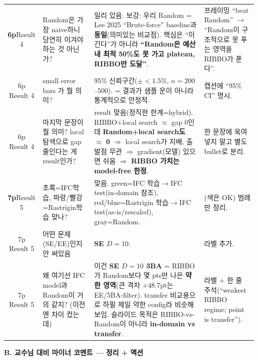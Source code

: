 \documentclass[10pt]{article}
\begin{document}
\begin{longtable}{S Q A F}
\textbf{6p}\newline Result 4 & Random은 가장 naive하니 당연히 이겨야 하는 것 아닌가? & 일리 있음. 보강: 우리 Random = Lee 2025 ``Brute-force'' baseline과 \textbf{동일}(의미있는 비교점). 핵심은 ``이긴다''가 아니라 \textbf{``Random은 예산 내 최적 50\%도 못 가고 plateau, RIBBO만 도달''}. & 프레이밍 ``beat Random'' $\to$ ``Random이 구조적으로 못 푸는 영역을 RIBBO가 푼다''. \\
6p Result 4 & small error bars 가 뭘 의미? & 95\% 신뢰구간($\pm{<}1.5\%$, $n{=}200$--$500$). = 결과가 샘플 운이 아니라 통계적으로 안정적. & 캡션에 ``95\% CI'' 명시. \\
6p Result 4 & 마지막 문장이 뭘 의미? local 탐색으로 gap 줄인다는 게 result인가? & result 맞음(정직한 한계=hybrid). RIBBO+local search $\approx$ gap 0인데 \textbf{Random+local search도 $\approx$ 0} $\Rightarrow$ local search가 지배, 출발점 무관 $\Rightarrow$ gradient(모델) 있으면 쉬움 $\Rightarrow$ \textbf{RIBBO 가치는 model-free 한정}. & 한 문장에 욱여넣지 말고 별도 bullet로 분리. \\
\midrule

\textbf{7p}\newline Result 5 & 초록=IFC학습, 파랑/빨강=Rastrigin학습 맞나? & 맞음. green=IFC 학습$\to$IFC test(in-domain 참조), red/blue=Rastrigin 학습$\to$IFC test(as-is/rescaled), gray=Random. & (색은 OK) 범례만 정리. \\
7p Result 5 & 어떤 문제(SE/EE)인지 안 써있음 & \textbf{SE $D{=}10$}. & 라벨 추가. \\
7p Result 5 & 왜 여기선 IFC model과 Random이 거의 같지? (이전엔 차이 컸는데) & 이건 \textbf{SE $D{=}10$ 3BA} = RIBBO가 Random보다 몇 pts만 나은 \textbf{약한 영역}(큰 격차 $+48.7$pt는 EE/5BA-filter). transfer 비교용으로 하필 제일 약한 config라 비슷해 보임. 슬라이드 목적은 RIBBO-vs-Random이 아니라 \textbf{in-domain vs transfer}. & 라벨 + 한 줄 주석(``weakest RIBBO regime; point is transfer''). \\
\bottomrule
\end{longtable}

\vspace{4pt}
{\large\bfseries\color{hdr} B. 교수님 대비 마이너 코멘트 — 정리 + 액션}
\vspace{3pt}
\end{document}
